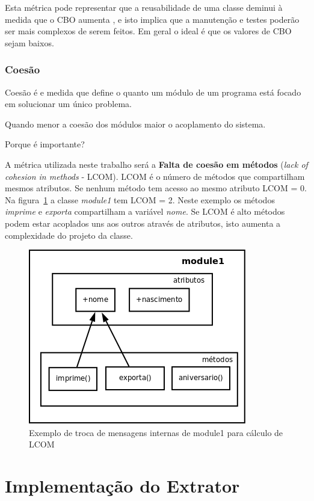 Esta métrica pode representar que a reusabilidade de uma classe deminui à
medida que o CBO aumenta \cite{engenhariaDeSoftwarePressman}, e isto implica
que a manutenção e testes poderão ser mais complexos de serem feitos. Em geral
o ideal é que os valores de CBO sejam baixos.

\subsection{Coesão}

Coesão é e medida que define o quanto um módulo de um programa está focado em
solucionar um único problema.

Quando menor a coesão dos módulos maior o acoplamento do sistema.

Porque é importante?

A métrica utilizada neste trabalho será a {\bf Falta de coesão em métodos}
({\it lack of cohesion in methods} - LCOM). LCOM é o número de métodos que
compartilham mesmos atributos. Se nenhum método tem acesso ao mesmo atributo
LCOM = 0. Na figura~\ref{fig:exemplo-lcom} a classe {\it module1} tem LCOM = 2.
Neste exemplo os métodos {\it imprime} e {\it exporta} compartilham a variável
{\it nome}. Se LCOM é alto métodos podem estar acoplados uns aos outros através
de atributos, isto aumenta a complexidade do projeto da classe.

\begin{figure}[h]
\center
\includegraphics[scale=0.4]{imagens/exemplo-lcom}
\caption{Exemplo de troca de mensagens internas de module1 para cálculo de LCOM}
\label{fig:exemplo-lcom}
\end{figure}

\chapter{Implementação do Extrator} \label{ch:implementacao}

